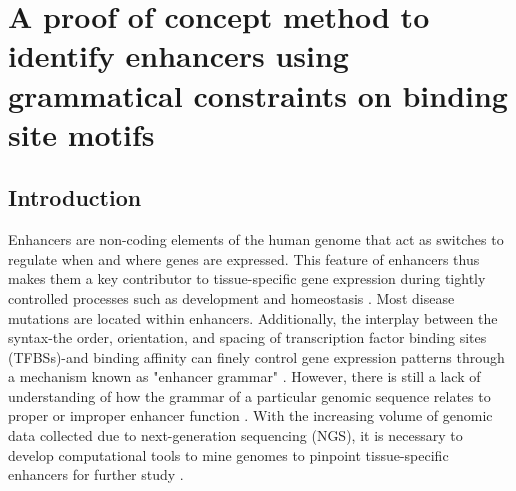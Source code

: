 \chapter{A proof of concept method to identify enhancers using grammatical constraints on binding site motifs}
\label{chap:Proof of concept method to identify enhancers}

\section{Introduction}

Enhancers are non-coding elements of the human genome that act as switches to regulate when and where genes are expressed. This feature of enhancers thus makes them a key contributor to tissue-specific gene expression during tightly controlled processes such as development and homeostasis \cite{levine2010,heinz2010,small1992,spitz2012,liu2012a,swanson2010a}. Most disease mutations are located within enhancers. Additionally, the interplay between the syntax-the order, orientation, and spacing of transcription factor binding sites (TFBSs)-and binding affinity can finely control gene expression patterns through a mechanism known as "enhancer grammar" \cite{maurano2012,tak2015a,visel2009,jindal2021}. However, there is still a lack of understanding of how the grammar of a particular genomic sequence relates to proper or improper enhancer function \cite{jindal2021}. With the increasing volume of genomic data collected due to next-generation sequencing (NGS), it is necessary to develop computational tools to mine genomes to pinpoint tissue-specific enhancers for further study \cite{leonelli2019,marx2013,pal2020,stephens2015}. 

